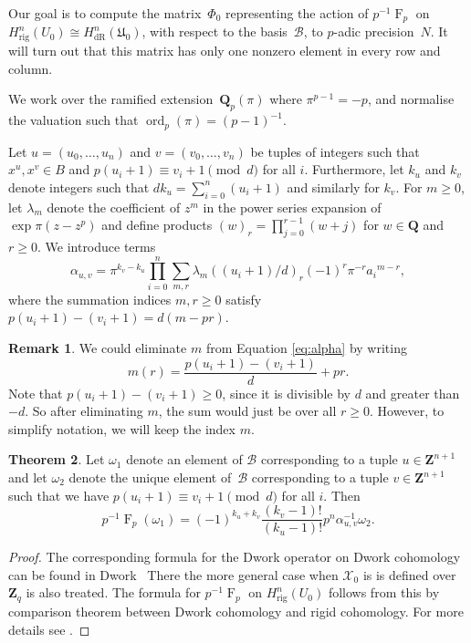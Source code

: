 \documentclass[a4paper,11pt]{article}
\numberwithin{equation}{section}
\newcommand{\ZZ}{\mathbf{Z}} %
\newcommand{\QQ}{\mathbf{Q}} %
\DeclareMathOperator{\ord}{ord}          %
\DeclareMathOperator{\Frob}{F}           %
\providecommand{\HdR}{H_{\text{dR}}}    %
\providecommand{\Hrig}{H_{\text{rig}}}  %
\providecommand{\cB}{\mathcal{B}} %
\theoremstyle{definition}
\newtheorem{thm}{Theorem}[section]
\newtheorem{rem}[thm]{Remark}
\begin{document}
Our goal is to compute 
the matrix~$\Phi_0$ representing the action of $p^{-1} \Frob_p$ on 
$\Hrig^n(U_0) \cong \HdR^n(\mathfrak{U}_0)$, with respect to the basis~$\cB$, 
to $p$-adic precision~$N$. It will turn out that this matrix has only one
nonzero element in every row and column.

We work over the ramified extension~$\QQ_p(\pi)$ where $\pi^{p-1} = -p$, 
and normalise the valuation such that \mbox{$\ord_p(\pi) = (p-1)^{-1}$}.

Let $u = (u_0, \dotsc, u_n)$ and $v = (v_0, \dotsc, v_n)$ be tuples 
of integers such that $x^u, x^v \in B$ and $p (u_i+1) \equiv v_i+1 \pmod{d}$
for all $i$. Furthermore, let $k_u$ and $k_v$ denote integers such that 
$d k_u = \sum_{i=0}^n (u_i + 1)$ and similarly for $k_v$.  For $m \geq 0$, 
let $\lambda_m$ denote the coefficient of $z^m$ in the power series expansion 
of $\exp \pi (z - z^p)$ and define products $(w)_r = \prod_{j=0}^{r-1} (w + j)$ 
for $w \in \QQ$ and $r \geq 0$. We introduce terms
\begin{equation} \label{eq:alpha}
\alpha_{u,v} = \pi^{k_v - k_u} \prod_{i = 0}^n \sum_{m, r} \lambda_m ((u_i + 1) / d)_r (-1)^r \pi^{-r} {a_i}^{m-r},
\end{equation}
where the summation indices $m, r \geq 0$ satisfy $p (u_i+1) - (v_i+1) = d (m - pr)$.

\begin{rem}
We could eliminate $m$ from Equation \eqref{eq:alpha} by writing 
\[
m(r)=\frac{p(u_i+1) - (v_i+1)}{d}+pr.
\]
Note that $p(u_i+1) - (v_i+1) \geq 0$, since it is divisible by $d$ and greater than $-d$.
So after eliminating $m$, the sum would just be over all $r \geq 0$. However, to simplify
notation, we will keep the index $m$.
\end{rem}

\begin{thm} \label{thm:01-03-diagfrob}
Let $\omega_1$ denote an element of $\cB$ corresponding to a tuple 
$u \in \ZZ^{n+1}$ and let $\omega_2$ denote the unique element of~$\cB$ 
corresponding to a tuple $v \in \ZZ^{n+1}$ such that
we have $p (u_i + 1) \equiv v_i + 1 \pmod{d}$ for all $i$. Then
\begin{equation*}
p^{-1} \Frob_p (\omega_1) = 
    (-1)^{k_u + k_v} \frac{(k_v - 1)!}{(k_u - 1)!} p^n \alpha_{u,v}^{-1} \omega_2.
\end{equation*}
\end{thm}

\begin{proof}
The corresponding formula for the Dwork operator on Dwork cohomology can
be found in Dwork~\citep[\S 4]{Dwork1964} 
There the more general case when $\mathcal{X}_0$ is 
is defined over $\ZZ_q$ is also treated. The formula for $p^{-1} \Frob_p$ on $\Hrig^n(U_0)$ 
follows from this by comparison theorem \cite[Theorem 1.12]{Katz} between Dwork cohomology 
and rigid cohomology. For more details see \cite[Theorem 4.4]{Gerkmann2007}.
\end{proof}
\end{document}
